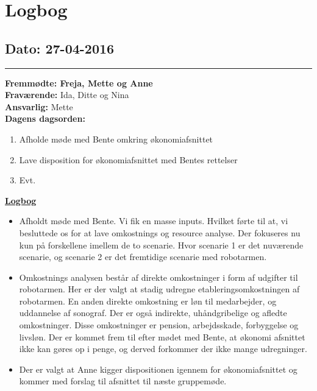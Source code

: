 \chapter{Logbog}
\section{Dato: 27-04-2016}
\hrule
\textbf{Fremmødte: Freja, Mette og Anne} \\
\textbf{Fraværende: } Ida, Ditte og Nina \\
\textbf{Ansvarlig: }Mette \\
\textbf{Dagens dagsorden: }
\begin{enumerate}
	\item Afholde møde med Bente omkring økonomiafsnittet
	\item Lave disposition for økonomiafsnittet med Bentes rettelser
	\item Evt. 
\end{enumerate}

\underline{\textbf{Logbog}}
\begin{itemize}
\item Afholdt møde med Bente. Vi fik en masse inputs. Hvilket førte til at, vi besluttede os for at lave omkostnings og resource analyse. Der fokuseres nu kun på forskellene imellem de to scenarie. Hvor scenarie 1 er det nuværende scenarie, og scenarie 2 er det fremtidige scenarie med robotarmen.
\item Omkostnings analysen består af direkte omkostninger i form af udgifter til robotarmen. Her er der valgt at stadig udregne etableringsomkostningen af robotarmen. En anden direkte omkostning er løn til medarbejder, og uddannelse af sonograf. Der er også indirekte, uhåndgribelige og afledte omkostninger. Disse omkostninger er pension, arbejdsskade, forbyggelse og livsløn. Der er kommet frem til efter mødet med Bente, at økonomi afsnittet ikke kan gøres op i penge, og derved forkommer der ikke mange udregninger. 
\item Der er valgt at Anne kigger dispositionen igennem for økonomiafsnittet og kommer med forslag til afsnittet til næste gruppemøde. \\

\end{itemize}
